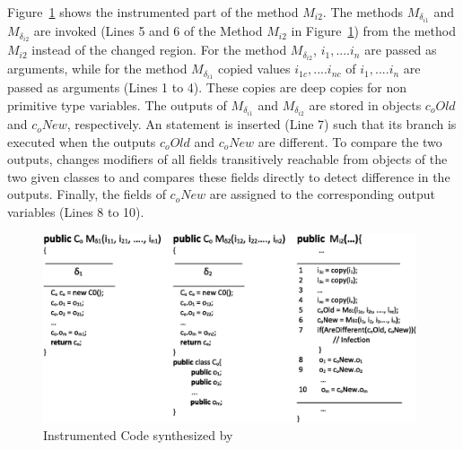 Figure~\ref{fig:instrumented} shows the instrumented part of the method $M_{i2}$. 
The methods $M_{\delta_{i1}}$ and $M_{\delta_{i2}}$ are invoked (Lines 5 and 6 of the Method $M_{i2}$ in Figure~\ref{fig:instrumented}) from the method $M_{i2}$ instead of the changed region.
For the method $M_{\delta_{i2}}$, $i_1,....i_n$ are passed as arguments, while for the method $M_{\delta_{i1}}$
copied values $i_{1c},....i_{nc}$ of $i_1,....i_n$ are passed as arguments (Lines 1 to 4). These copies are deep copies for non primitive type variables.
The outputs of $M_{\delta_{i1}}$ and $M_{\delta_{i2}}$ are stored in objects $c_{o}Old$ and $c_{o}New$, respectively.
An  statement is inserted (Line 7) such that its  branch is executed when the outputs 
$c_{o}Old$ and $c_{o}New$ are different.    
To compare the two outputs,  changes modifiers 
of all fields transitively reachable from objects of the
two given classes to  and compares these fields directly to detect difference in the outputs.
Finally, the fields of $c_{o}New$ are assigned to the corresponding output variables (Lines 8 to 10).



\begin{figure}[t]
\hspace{0.5cm}
	\includegraphics[width=11cm, keepaspectratio]{Figures/instrumentation}
  
\vspace{-0.15 in}
\caption{Instrumented Code synthesized by }
\label{fig:instrumented}
\vspace{-0.25 in}
\end{figure}


